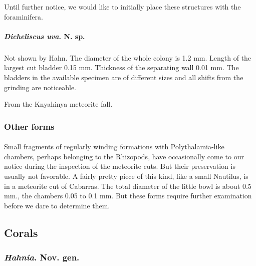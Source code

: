 \documentclass[a4paper, 12pt, oneside]{article}
\begin{document}
Until further notice, we would like to initially place these structures with the foraminifera.
\paragraph{\emph{Dicheliscus uva}. N. sp.}
\subparagraph{}
Not shown by Hahn. The diameter of the whole colony is 1.2 mm. Length of the largest cut bladder 0.15 mm. Thickness of the separating wall 0.01 mm. The bladders in the available specimen are of different sizes and all shifts from the grinding are noticeable.

From the Knyahinya meteorite fall.
\subsubsection{Other forms}
\paragraph*{}
Small fragments of regularly winding formations with Polythalamia-like chambers, perhaps belonging to the Rhizopods, have occasionally come to our notice during the inspection of the meteorite cuts. But their preservation is usually not favorable. A fairly pretty piece of this kind, like a small Nautilus, is in a meteorite cut of Cabarras. The total diameter of the little bowl is about 0.5 mm., the chambers 0.05 to 0.1 mm. But these forms require further examination before we dare to determine them.
\clearpage
\subsection{Corals}
\subsubsection{\emph{Hahnia}. Nov. gen.}
\end{document}
